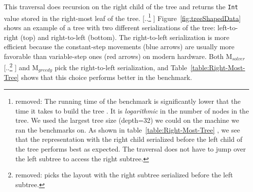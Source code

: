 \documentclass[acmsmall,review,anonymous]{acmart}\settopmatter{printfolios=true,printccs=false,printacmref=false}
\newcommand{\systemSolver}{{\sc M$_{\mathit{solver}}$}\xspace} %
\newcommand{\systemGreedy}{{\sc M$_{\mathit{greedy}}$}\xspace} %
\providecommand{\DIFaddtex}[1]{{\protect\color{blue} \sf #1}} %
\providecommand{\DIFdeltex}[1]{{\protect\color{red} [..\footnote{removed: #1} ]}} %
\providecommand{\DIFaddbegin}{} %
\providecommand{\DIFaddend}{} %
\providecommand{\DIFdelbegin}{} %
\providecommand{\DIFdelend}{} %
\providecommand{\DIFadd}[1]{\texorpdfstring{\DIFaddtex{#1}}{#1}} %
\providecommand{\DIFdel}[1]{\texorpdfstring{\DIFdeltex{#1}}{}} %
\newcommand{\DIFscaledelfig}{0.5}
\newlength{\DIFdelgraphicswidth} %
\newlength{\DIFdelgraphicsheight} %
\newcommand{\DIFaddincludegraphics}[2][]{{\color{blue}\fbox{\DIFOincludegraphics[#1]{#2}}}} %
\newcommand{\DIFdelincludegraphics}[2][]{%
\sbox{\DIFdelgraphicsbox}{\DIFOincludegraphics[#1]{#2}}%
\settoboxwidth{\DIFdelgraphicswidth}{\DIFdelgraphicsbox} %
\settoboxtotalheight{\DIFdelgraphicsheight}{\DIFdelgraphicsbox} %
\scalebox{\DIFscaledelfig}{%
\parbox[b]{\DIFdelgraphicswidth}{\usebox{\DIFdelgraphicsbox}\\[-\baselineskip] \rule{\DIFdelgraphicswidth}{0em}}\llap{\resizebox{\DIFdelgraphicswidth}{\DIFdelgraphicsheight}{%
\setlength{\unitlength}{\DIFdelgraphicswidth}%
\begin{picture}(1,1)%
\thicklines\linethickness{2pt} %
{\color[rgb]{1,0,0}\put(0,0){\framebox(1,1){}}}%
{\color[rgb]{1,0,0}\put(0,0){\line( 1,1){1}}}%
{\color[rgb]{1,0,0}\put(0,1){\line(1,-1){1}}}%
\end{picture}%
}\hspace*{3pt}}} %
} %
\DeclareRobustCommand{\DIFaddbegin}{\DIFOaddbegin \let\includegraphics\DIFaddincludegraphics} %
\DeclareRobustCommand{\DIFaddend}{\DIFOaddend \let\includegraphics\DIFOincludegraphics} %
\DeclareRobustCommand{\DIFdelbegin}{\DIFOdelbegin \let\includegraphics\DIFdelincludegraphics} %
\DeclareRobustCommand{\DIFdelend}{\DIFOaddend \let\includegraphics\DIFOincludegraphics} %
\begin{document}
\DIFaddend This traversal does recursion on the right child of the tree and returns the \lstinline|Int| value stored in the right-most leaf of the tree.
\DIFdelbegin \DIFdel{The running time of the benchmark is significantly lower that the time it takes to build the tree . It is \textit{logarithmic} in the number of nodes in the tree. We used the largest tree size (depth=32) we could on the machine we ran the benchmarks on.
As shown in table~\ref{table:Right-Most-Tree} , we see that the representation with the right child serialized before the left child of the tree performs best as expected. The traversal does not have to jump over the left subtree to access the right subtree.
}\DIFdelend \DIFaddbegin \DIFadd{Figure~\ref{fig:treeShapedData} shows an example of a tree with two different serializations of the tree: left-to-right (top) and right-to-left (bottom).
The right-to-left serialization is more efficient because the constant-step movements (blue arrows) are usually more favorable than variable-step ones (red arrows) on modern hardware.
Both }\DIFaddend \systemSolver \DIFdelbegin \DIFdel{picks the layout with
the right subtree serialized before the left subtree.
}\DIFdelend \DIFaddbegin \DIFadd{and }\systemGreedy \DIFadd{pick the right-to-left serialization, and
Table~\ref{table:Right-Most-Tree} shows that this choice performs better in the benchmark.
}\DIFaddend 
\end{document}
